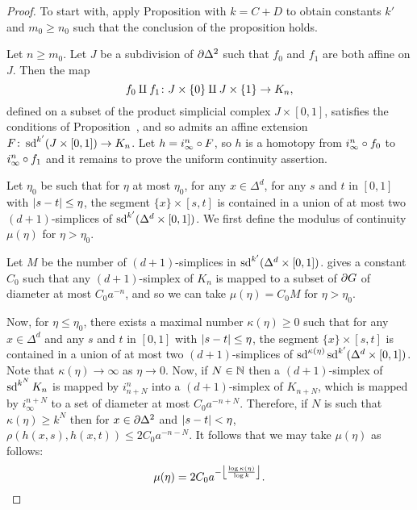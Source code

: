 \documentclass[a4paper]{article}
\begin{document}
\begin{proof}
  To start with, apply Proposition  with $k = C +
  D$ to obtain constants $k'$ and $m_0\geq n_0$ such that the conclusion of the
  proposition holds. 

  Let $n \geq m_0$.  Let $J$ be a subdivision of $\boundary\Delta^2$ such
  that $f_0$ and $f_1$ are both affine on $J$. Then the map 
  \begin{equation*}
    f_0 \disjointunion f_1 \from J \times \{0\} \disjointunion J \times \{1\}
          \to K_n,
  \end{equation*}
  defined on a subset of the product simplicial complex $J \times [0,1]$,
  satisfies the conditions of Proposition~, and so admits
  an affine extension $F \from \sd^{k'} (J \times [0,1]) \to K_n$. Let $h =
  i^n_\infty \composed F$, so $h$ is a homotopy from $i^n_\infty\composed f_0$
  to $i^n_\infty\composed f_1$ and it remains to prove the uniform continuity
  assertion.

  Let $\eta_0$ be such that for $\eta$ at most $\eta_0$, 
  for any $x \in \Delta^d$, for any $s$ and $t$ in $[0,1]$ with
  $\abs{s-t} \leq \eta$, the segment $\{x\} \times [s,t]$ is contained in a
  union of at most two $(d+1)$-simplices of $\sd^{k'}(\Delta^d \times [0,1])$.
  We first define the modulus of continuity $\mu(\eta)$ for $\eta > \eta_0$.

  Let $M$ be the number of $(d+1)$-simplices in $\sd^{k'}(\Delta^d \times
  [0,1])$.   gives a constant $C_0$ such that any
  $(d+1)$-simplex of $K_n$ is mapped to a subset of $\boundary G$ of diameter
  at most $C_0 a^{-n}$, and so we can take $\mu(\eta) = C_0M$ for $\eta >
  \eta_0$.

  Now, for $\eta \leq \eta_0$, there exists a maximal number $\kappa(\eta) \geq
  0$ such that for any $x \in \Delta^d$ and any $s$ and $t$ in $[0,1]$ with
  $\abs{s-t} \leq \eta$, the segment $\{x\} \times [s,t]$ is contained in a
  union of at most two $(d+1)$-simplices of
  $\sd^{\kappa(\eta)}\sd^{k'}(\Delta^d\times[0,1])$. Note that $\kappa(\eta)
  \to \infty$ as $\eta \to 0$. Now, if $N\in\naturals$ then a $(d+1)$-simplex of
  $\sd^{k^N}K_n$ is mapped by $i^n_{n+N}$ into a $(d+1)$-simplex of $K_{n+N}$,
  which is mapped by $i^{n+N}_\infty$ to a set of diameter at most
  $C_0a^{-n+N}$. Therefore, if $N$ is such that $\kappa(\eta) \geq k^N$ then
  for $x \in \boundary\Delta^2$ and $\abs{s-t} < \eta$, $\rho(h(x,s),
  h(x,t)) \leq 2C_0a^{-n-N}$. It follows that we may take $\mu(\eta)$ as follows:
  \begin{equation*}
    \mu(\eta) = 2C_0 a^{-\floor*{\frac{\log\kappa(\eta)}{\log k}}}.\qedhere
  \end{equation*}
\end{proof}
\end{document}
